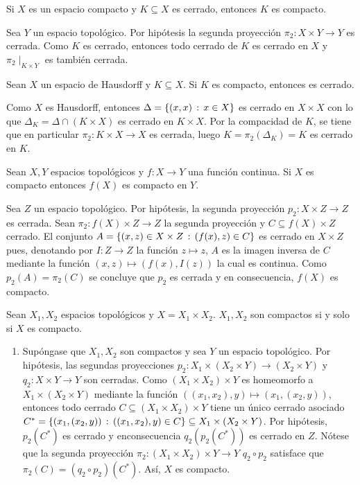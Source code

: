 \begin{Teo}
  Si $X$ es un espacio compacto y $K\subseteq X$ es cerrado,
  entonces $K$ es compacto.
\end{Teo}
\begin{Demo}
  Sea $Y$ un espacio topológico. Por hipótesis la segunda proyección
  $\pi_2:X\times Y\longrightarrow Y$  es cerrada. Como $K$ es cerrado,
  entonces todo cerrado de $K$ es cerrado en $X$ y $\pi_2\mid_{K\times Y}$
  es también cerrada.
\end{Demo}
\begin{Teo}
  Sean $X$ un espacio de Hausdorff y $K\subseteq X$. Si $K$ es compacto,
  entonces es cerrado.
\end{Teo}
\begin{Demo}
  Como $X$ es Hausdorff, entonces $\Delta=\left\{(x,x)\,:\,x\in X\right\}$ es cerrado en $X\times X$
  con lo que $\Delta_K=\Delta\cap(K\times X)$ es cerrado en $K\times X$. Por la compacidad
  de $K$, se tiene que en particular $\pi_2:K\times X\longrightarrow X$ es cerrada, luego
  $K=\pi_2(\Delta_K)=K$ es cerrado en $K$.
\end{Demo}
\begin{Teo}
  Sean $X,Y$ espacios topológicos y $f:X\longrightarrow Y$ una función continua.
  Si $X$ es compacto entonces $f(X)$ es compacto en $Y$.
\end{Teo}
\begin{Demo}
  Sea $Z$ un espacio topológico. Por hipótesis, la segunda proyección
  $p_2:X\times Z\longrightarrow Z$ es cerrada. Sean $\pi_2:f(X)\times Z\longrightarrow Z$
  la segunda proyección y $C\subseteq f(X)\times Z$ cerrado. El conjunto
  $A=\left\{(x,z)\in X\times Z\,:\,(f(x),z)\in C\right\}$ es cerrado en $X\times Z$ pues,
  denotando por $I:Z\longrightarrow Z$ la función $z\longmapsto z$,
  $A$ es la imagen inversa de $C$ mediante la función $(x,z)\longmapsto(f(x),I(z))$ la cual
  es continua. Como $p_2(A)=\pi_2(C)$ se concluye que $p_2$ es cerrada y en consecuencia,
  $f(X)$ es compacto.
\end{Demo}
\begin{Teo}
  Sean $X_1,X_2$ espacios topológicos y $X=X_1\times X_2$. $X_1,X_2$
  son compactos si y solo si $X$ es compacto.
\end{Teo}
\begin{Demo}
\begin{enumerate}
  \item Supóngase que $X_1,X_2$ son compactos y sea $Y$ un espacio topológico.
  Por hipótesis, las segundas proyecciones $p_2:X_1\times(X_2\times Y)\longrightarrow(X_2\times Y)$
  y $q_2:X\times Y\longrightarrow Y$ son cerradas. Como $(X_1\times X_2)\times Y$
  es homeomorfo a $X_1\times(X_2\times Y)$ mediante la función
  $((x_1,x_2),y)\longmapsto(x_1,(x_2,y))$, entonces todo cerrado $C\subseteq(X_1\times X_2)\times Y$
  tiene un único cerrado asociado 
  $C^*=\left\{(x_1,(x_2,y))\,:\,((x_1,x_2),y)\in C\right\}\subseteq X_1\times(X_2\times Y)$. 
  Por hipótesis, $p_2(C^*)$ es cerrado y enconsecuencia $q_2(p_2(C^*))$ es cerrado
  en $Z$. Nótese que la segunda proyección
  $\pi_2:(X_1\times X_2)\times Y\longrightarrow Y$ $q_2\circ p_2$ satisface que
  $\pi_2(C)=(q_2\circ p_2)(C^*)$. Así, $X$ es compacto.
\end{enumerate}
\end{Demo}
